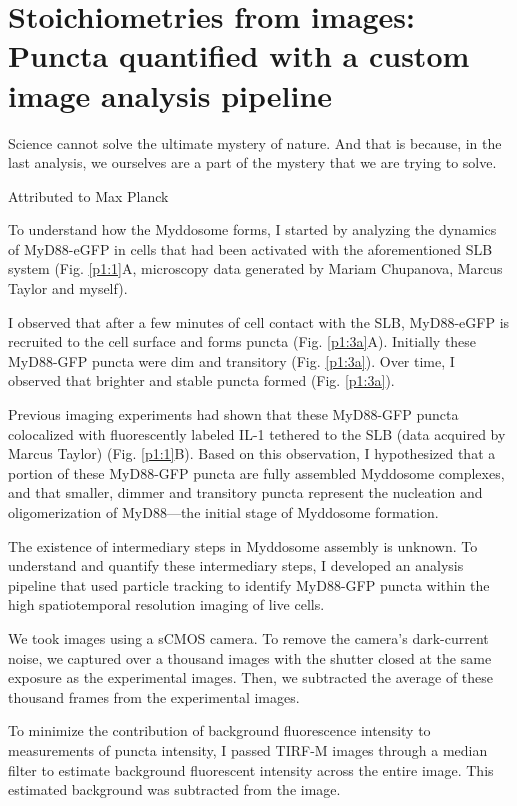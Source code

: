 \chapter{Stoichiometries from images: Puncta quantified with a custom image analysis pipeline}
\label{chapter:pipeline_v1}
\epigraph{Science cannot solve the ultimate mystery of nature. And that is because, in the last analysis, we ourselves are a part of the mystery that we are trying to solve.}{Attributed to Max Planck}

To understand how the Myddosome forms, I started by analyzing the dynamics of MyD88-eGFP in cells that had been activated with the aforementioned SLB system (Fig. \ref{p1:1}A, microscopy data generated by Mariam Chupanova, Marcus Taylor and myself).

I observed that after a few minutes of cell contact with the SLB, MyD88-eGFP is recruited to the cell surface and forms puncta (Fig. \ref{p1:3a}A). Initially these MyD88-GFP puncta were dim and transitory (Fig. \ref{p1:3a}). Over time, I observed that brighter and stable puncta formed (Fig. \ref{p1:3a}).

Previous imaging experiments had shown that these MyD88-GFP puncta colocalized with fluorescently labeled IL-1 tethered to the SLB (data acquired by Marcus Taylor) (Fig. \ref{p1:1}B). Based on this observation, I hypothesized that a portion of these MyD88-GFP puncta are fully assembled Myddosome complexes, and that smaller, dimmer and transitory puncta represent the nucleation and oligomerization of MyD88—the initial stage of Myddosome formation.

The existence of intermediary steps in Myddosome assembly is unknown. To understand and quantify these intermediary steps, I developed an analysis pipeline that used particle tracking to identify MyD88-GFP puncta within the high spatiotemporal resolution imaging of live cells.

We took images using a sCMOS camera. To remove the camera's dark-current noise, we captured over a thousand images with the shutter closed at the same exposure as the experimental images. Then, we subtracted the average of these thousand frames from the experimental images.

To minimize the contribution of background fluorescence intensity to measurements of puncta intensity, I passed TIRF-M images through a median filter to estimate background fluorescent intensity across the entire image. This estimated background was subtracted from the image.


